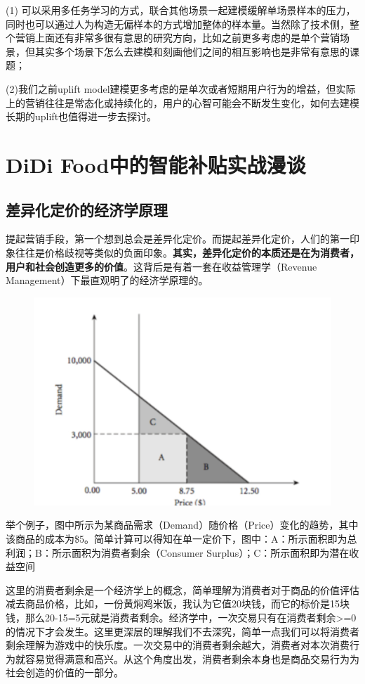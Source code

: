 \documentclass[12pt]{article}
\begin{document}
(1) 可以采用多任务学习的方式，联合其他场景一起建模缓解单场景样本的压力，同时也可以通过人为构造无偏样本的方式增加整体的样本量。当然除了技术侧，整个营销上面还有非常多很有意思的研究方向，比如之前更多考虑的是单个营销场景，但其实多个场景下怎么去建模和刻画他们之间的相互影响也是非常有意思的课题；

(2)我们之前uplift model建模更多考虑的是单次或者短期用户行为的增益，但实际上的营销往往是常态化或持续化的，用户的心智可能会不断发生变化，如何去建模长期的uplift也值得进一步去探讨。

\section{DiDi Food中的智能补贴实战漫谈\cite{Causal_Inference_In_DiDi}}
\subsection{差异化定价的经济学原理}
提起营销手段，第一个想到总会是差异化定价。而提起差异化定价，人们的第一印象往往是价格歧视等类似的负面印象。\textbf{其实，差异化定价的本质还是在为消费者，用户和社会创造更多的价值}。这背后是有着一套在收益管理学（Revenue Management）下最直观明了的经济学原理的。
\begin{figure}[H]
    \centering
    \includegraphics[width=.6\textwidth]{fig/Causal_Inference_In_DiDi_1.png}
\end{figure}
举个例子，图中所示为某商品需求（Demand）随价格（Price）变化的趋势，其中该商品的成本为\$5。简单计算可以得知在单一定价下，图中：A：所示面积即为总利润；B：所示面积为消费者剩余（Consumer Surplus）；C：所示面积即为潜在收益空间

这里的消费者剩余是一个经济学上的概念，简单理解为消费者对于商品的价值评估减去商品价格，比如，一份黄焖鸡米饭，我认为它值20块钱，而它的标价是15块钱，那么20-15=5元就是消费者剩余。经济学中，一次交易只有在消费者剩余>=0的情况下才会发生。这里更深层的理解我们不去深究，简单一点我们可以将消费者剩余理解为游戏中的快乐度。一次交易中的消费者剩余越大，消费者对本次消费行为就容易觉得满意和高兴。从这个角度出发，消费者剩余本身也是商品交易行为为社会创造的价值的一部分。
\end{document}
